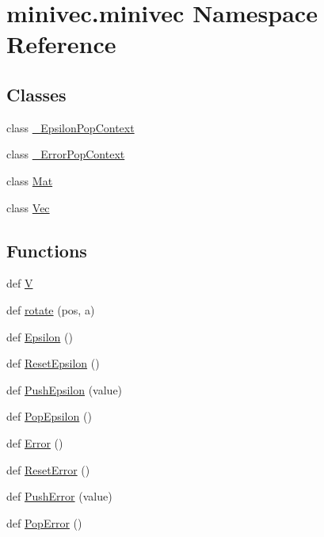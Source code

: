 \hypertarget{namespaceminivec_1_1minivec}{}\section{minivec.\+minivec Namespace Reference}
\label{namespaceminivec_1_1minivec}
\subsection*{Classes}
\begin{DoxyCompactItemize}
\item 
class \hyperlink{classminivec_1_1minivec_1_1___epsilon_pop_context}{\+\_\+\+Epsilon\+Pop\+Context}
\item 
class \hyperlink{classminivec_1_1minivec_1_1___error_pop_context}{\+\_\+\+Error\+Pop\+Context}
\item 
class \hyperlink{classminivec_1_1minivec_1_1_mat}{Mat}
\item 
class \hyperlink{classminivec_1_1minivec_1_1_vec}{Vec}
\end{DoxyCompactItemize}
\subsection*{Functions}
\begin{DoxyCompactItemize}
\item 
def \hyperlink{namespaceminivec_1_1minivec_a05c598591e86e4ad044aa85b35bfaf66}{V}
\item 
def \hyperlink{namespaceminivec_1_1minivec_a4575b51d4237083edbc93832a2c2754f}{rotate} (pos, a)
\item 
def \hyperlink{namespaceminivec_1_1minivec_afb2a679445010304189adfadaf5afbb3}{Epsilon} ()
\item 
def \hyperlink{namespaceminivec_1_1minivec_a621b0516abfdd5c4c6fa1a60c52f8539}{Reset\+Epsilon} ()
\item 
def \hyperlink{namespaceminivec_1_1minivec_a6f6f9c5c72491f8b2f085444db5a4edb}{Push\+Epsilon} (value)
\item 
def \hyperlink{namespaceminivec_1_1minivec_a5ac8925e7a712892716c2799dbaacc0f}{Pop\+Epsilon} ()
\item 
def \hyperlink{namespaceminivec_1_1minivec_aaa1925ce113b6959b2029bedda0dc79f}{Error} ()
\item 
def \hyperlink{namespaceminivec_1_1minivec_a32f05f2e9bebe41c8d7b1a810bd6acc2}{Reset\+Error} ()
\item 
def \hyperlink{namespaceminivec_1_1minivec_a8047c80a5c0d2919929d72f4265fd20b}{Push\+Error} (value)
\item 
def \hyperlink{namespaceminivec_1_1minivec_a2b5146c60a68e2eb846a46e96fdaa7cb}{Pop\+Error} ()
\end{DoxyCompactItemize}
